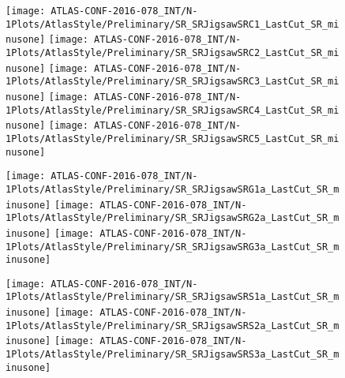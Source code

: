 \begin{figure}[tbph]
\begin{center}
\texttt{[image: ATLAS-CONF-2016-078\_INT/N-1Plots/AtlasStyle/Preliminary/SR\_SRJigsawSRC1\_LastCut\_SR\_minusone]}
\texttt{[image: ATLAS-CONF-2016-078\_INT/N-1Plots/AtlasStyle/Preliminary/SR\_SRJigsawSRC2\_LastCut\_SR\_minusone]}
\texttt{[image: ATLAS-CONF-2016-078\_INT/N-1Plots/AtlasStyle/Preliminary/SR\_SRJigsawSRC3\_LastCut\_SR\_minusone]}
\texttt{[image: ATLAS-CONF-2016-078\_INT/N-1Plots/AtlasStyle/Preliminary/SR\_SRJigsawSRC4\_LastCut\_SR\_minusone]}
\texttt{[image: ATLAS-CONF-2016-078\_INT/N-1Plots/AtlasStyle/Preliminary/SR\_SRJigsawSRC5\_LastCut\_SR\_minusone]}
\end{center}
\caption{}
\label{fig:src_scale}
\end{figure}

\begin{figure}[tbph]
\begin{center}
\texttt{[image: ATLAS-CONF-2016-078\_INT/N-1Plots/AtlasStyle/Preliminary/SR\_SRJigsawSRG1a\_LastCut\_SR\_minusone]}
\texttt{[image: ATLAS-CONF-2016-078\_INT/N-1Plots/AtlasStyle/Preliminary/SR\_SRJigsawSRG2a\_LastCut\_SR\_minusone]}
\texttt{[image: ATLAS-CONF-2016-078\_INT/N-1Plots/AtlasStyle/Preliminary/SR\_SRJigsawSRG3a\_LastCut\_SR\_minusone]}
\end{center}
\caption{}
\label{fig:srg_scale}
\end{figure}

\begin{figure}[tbph]
\begin{center}
\texttt{[image: ATLAS-CONF-2016-078\_INT/N-1Plots/AtlasStyle/Preliminary/SR\_SRJigsawSRS1a\_LastCut\_SR\_minusone]}
\texttt{[image: ATLAS-CONF-2016-078\_INT/N-1Plots/AtlasStyle/Preliminary/SR\_SRJigsawSRS2a\_LastCut\_SR\_minusone]}
\texttt{[image: ATLAS-CONF-2016-078\_INT/N-1Plots/AtlasStyle/Preliminary/SR\_SRJigsawSRS3a\_LastCut\_SR\_minusone]}
\end{center}
\caption{}
\label{fig:srs_scale}
\end{figure}
